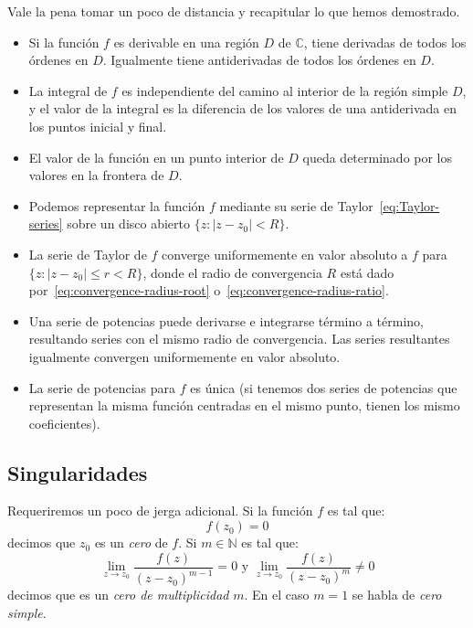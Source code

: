   Vale la pena tomar un poco de distancia
  y recapitular lo que hemos demostrado.
  \begin{itemize}
  \item
    Si la función \(f\) es derivable
    en una región \(D\) de \(\mathbb{C}\),
    tiene derivadas de todos los órdenes en \(D\).
    Igualmente tiene antiderivadas de todos los órdenes en \(D\).
  \item
    La integral de \(f\) es independiente del camino
    al interior de la región simple \(D\),
    y el valor de la integral
    es la diferencia de los valores de una antiderivada
    en los puntos inicial y final.
  \item
    El valor de la función en un punto interior de \(D\)
    queda determinado por los valores en la frontera de \(D\).
  \item
    Podemos representar la función \(f\) mediante
    su serie de Taylor~\eqref{eq:Taylor-series}
    sobre un disco abierto
      \(\{z \colon \lvert z - z_0 \rvert < R\}\).
  \item
    La serie de Taylor de \(f\)
    converge uniformemente en valor absoluto
    a \(f\) para \(\{z \colon \lvert z - z_0 \rvert \le r < R\}\),
    donde el radio de convergencia \(R\)
    está dado por~\eqref{eq:convergence-radius-root}
    o~\eqref{eq:convergence-radius-ratio}.
  \item
    Una serie de potencias
    puede derivarse e integrarse término a término,
    resultando series con el mismo radio de convergencia.
    Las series resultantes
    igualmente convergen uniformemente en valor absoluto.
  \item
    La serie de potencias para \(f\) es única
    (si tenemos dos series de potencias
     que representan la misma función
     centradas en el mismo punto,
     tienen los mismo coeficientes).
  \end{itemize}

\subsection{Singularidades}
\label{sec:singularities}

  Requeriremos un poco de jerga adicional.
  Si la función \(f\) es tal que:
  \begin{equation*}
    f(z_0)
      = 0
  \end{equation*}
  decimos que \(z_0\) es un \emph{cero} de \(f\).%
  Si \(m \in \mathbb{N}\) es tal que:
  \begin{equation*}
    \lim_{z \rightarrow z_0} \frac{f(z)}{(z - z_0)^{m - 1}}
      = 0
    \text{\ y\ }
    \lim_{z \rightarrow z_0} \frac{f(z)}{(z - z_0)^m}
      \ne 0
  \end{equation*}
  decimos que es un \emph{cero de multiplicidad} \(m\).
  En el caso \(m = 1\) se habla de \emph{cero simple}.

